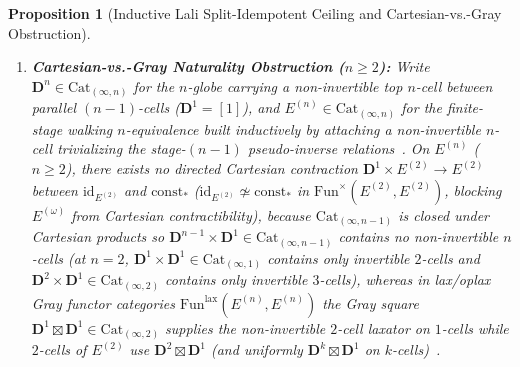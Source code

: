 \documentclass[10pt,twoside,openright]{book}
\theoremstyle{crmplain}
\newtheorem{proposition}[theorem]{Proposition}
\theoremstyle{crmdef}
\theoremstyle{crmremark}
\begin{document}
\begin{proposition}[Inductive Lali Split-Idempotent Ceiling and Cartesian-vs.-Gray Obstruction]
\begin{enumerate}[label=(\arabic*),leftmargin=2em]
  and this ceiling is sharp at $m = \max(K_x, K_y) + 2$ on the oriented join $\{a\} \star \Sigma^{K+1}(S^0)$. Above $\max(K_x, K_y) + 2$, both ambient $m$-cell animae are contractible so \emph{any} globular simulation induces an equivalence (\texttt{globularSim\_\allowbreak stabilization\_\allowbreak above\_\allowbreak height}), while the Gray-enriched Lali structure explains why concrete adjunctions preserve finite cell heights and drives Part~(2)'s obstruction. Both the globular cell-height stabilization bound and its sharp $m = K + 2$ join-suspension boundary are machine-checked on state-coalgebraic \texttt{GlobularSimulation} models in Lean~4 (\texttt{HomotopyCRM/\allowbreak OrdinalRank\allowbreak Completeness.lean}, 1,828 lines, 20 \texttt{\#print axioms} checks under the 4-Layer Gate) via \texttt{globularSim\_\allowbreak stabilization\_\allowbreak above\_\allowbreak height}, its specialization \texttt{prop11A\_\allowbreak lali\_\allowbreak stabilization\_\allowbreak above\_\allowbreak ceiling}, and \texttt{prop11A\_\allowbreak ceiling\_\allowbreak sharp\_\allowbreak at\_\allowbreak max\_\allowbreak add\_\allowbreak two} on \texttt{JoinSuspState.joinCone K}, while Gray-enriched lax-counit coherence and Part~(2) are proved in prose below.
  \item \textbf{Cartesian-vs.-Gray Naturality Obstruction ($n \ge 2$):} Write $\mathbf{D}^n \in \mathrm{Cat}_{(\infty, n)}$ for the $n$-globe carrying a non-invertible top $n$-cell between parallel $(n-1)$-cells ($\mathbf{D}^1 = [1]$), and $E^{(n)} \in \mathrm{Cat}_{(\infty, n)}$ for the finite-stage walking $n$-equivalence built inductively by attaching a non-invertible $n$-cell trivializing the stage-$(n-1)$ pseudo-inverse relations~\cite{HenryLoubaton25,ORW26}. On $E^{(n)}$ ($n \ge 2$), there exists no directed Cartesian contraction $\mathbf{D}^1 \times E^{(2)} \to E^{(2)}$ between $\mathrm{id}_{E^{(2)}}$ and $\mathrm{const}_*$ ($\mathrm{id}_{E^{(2)}} \not\simeq \mathrm{const}_*$ in $\mathrm{Fun}^{\times}(E^{(2)}, E^{(2)})$, blocking $E^{(\omega)}$ from Cartesian contractibility), because $\mathrm{Cat}_{(\infty, n-1)}$ is closed under Cartesian products so $\mathbf{D}^{n-1} \times \mathbf{D}^1 \in \mathrm{Cat}_{(\infty, n-1)}$ contains no non-invertible $n$-cells (at $n = 2$, $\mathbf{D}^1 \times \mathbf{D}^1 \in \mathrm{Cat}_{(\infty, 1)}$ contains only invertible $2$-cells and $\mathbf{D}^2 \times \mathbf{D}^1 \in \mathrm{Cat}_{(\infty, 2)}$ contains only invertible $3$-cells), whereas in lax/oplax Gray functor categories $\mathrm{Fun}^{\mathrm{lax}}(E^{(n)}, E^{(n)})$ the Gray square $\mathbf{D}^1 \boxtimes \mathbf{D}^1 \in \mathrm{Cat}_{(\infty, 2)}$ supplies the non-invertible $2$-cell laxator on $1$-cells while $2$-cells of $E^{(2)}$ use $\mathbf{D}^2 \boxtimes \mathbf{D}^1$ (and uniformly $\mathbf{D}^k \boxtimes \mathbf{D}^1$ on $k$-cells)~\cite{GepnerHeine26,Heine26,Geiss26}.
\end{enumerate}
\end{proposition}
\end{document}
